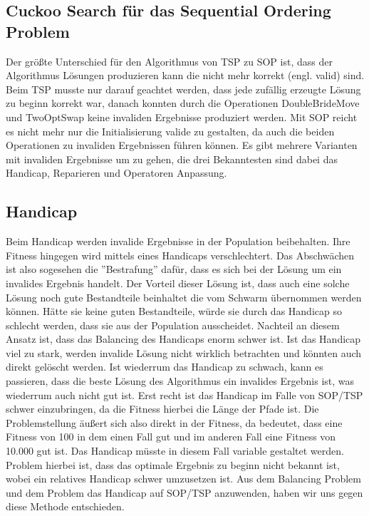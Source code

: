 \documentclass[conference]{IEEEtran}
\begin{document}
    \subsection{Cuckoo Search für das Sequential Ordering Problem}
      Der größte Unterschied für den Algorithmus von TSP zu SOP ist, dass der Algorithmus Lösungen 
      produzieren kann die nicht mehr korrekt (engl. valid) sind. Beim TSP musste nur darauf geachtet werden, 
      dass jede zufällig erzeugte Lösung zu beginn korrekt war, danach konnten durch die Operationen 
      DoubleBrideMove und TwoOptSwap keine invaliden Ergebnisse produziert werden.
      Mit SOP reicht es nicht mehr nur die Initialisierung valide zu gestalten, da auch die 
      beiden Operationen zu invaliden Ergebnissen führen können. 
      Es gibt mehrere Varianten mit invaliden Ergebnisse um zu gehen, die drei Bekanntesten sind 
      dabei das Handicap, Reparieren und Operatoren Anpassung. 

    \subsection{Handicap}
      Beim Handicap werden invalide 
      Ergebnisse in der Population beibehalten. Ihre Fitness hingegen wird mittels eines Handicaps 
      verschlechtert. Das Abschwächen ist also sogesehen die ''Bestrafung'' dafür, dass es sich bei der 
      Lösung um ein invalides Ergebnis handelt. Der Vorteil dieser Lösung ist, dass auch eine solche 
      Lösung noch gute Bestandteile beinhaltet die vom Schwarm übernommen werden können. Hätte sie
      keine guten Bestandteile, würde sie durch das Handicap so schlecht werden, dass sie aus der
      Population ausscheidet. Nachteil an diesem Ansatz ist, dass das Balancing des Handicaps 
      enorm schwer ist. Ist das Handicap viel zu stark, werden invalide Lösung nicht wirklich 
      betrachten und könnten auch direkt gelöscht werden. Ist wiederrum das Handicap zu schwach, 
      kann es passieren, dass die beste Lösung des Algorithmus ein invalides Ergebnis ist, was 
      wiederrum auch nicht gut ist. Erst recht ist das Handicap im Falle von SOP/TSP schwer 
      einzubringen, da die Fitness hierbei die Länge der Pfade ist. Die Problemstellung äußert 
      sich also direkt in der Fitness, da bedeutet, dass eine Fitness von 100 in dem einen Fall
      gut und im anderen Fall eine Fitness von 10.000 gut ist. Das Handicap müsste in diesem Fall 
      variable gestaltet werden. Problem hierbei ist, dass das optimale Ergebnis zu beginn nicht 
      bekannt ist, wobei ein relatives Handicap schwer umzusetzen ist. Aus dem Balancing Problem 
      und dem Problem das Handicap auf SOP/TSP anzuwenden, haben wir uns gegen diese Methode 
      entschieden.
\end{document}
